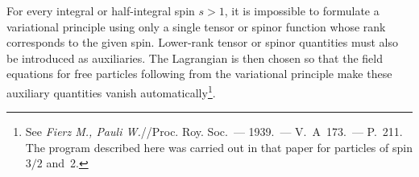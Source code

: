 For every integral or half-integral spin $s>1$, it is impossible to formulate a variational principle using only a single tensor or spinor function whose rank corresponds to the given spin. Lower-rank tensor or spinor quantities must also be introduced as auxiliaries. The Lagrangian is then chosen so that the field equations for free particles following from the variational principle make these auxiliary quantities vanish automatically\footnote{See \emph{Fierz M., Pauli W.}//Proc. Roy. Soc.~--- 1939.~--- V.~A~173.~--- P.~211. The program described here was carried out in that paper for particles of spin $3/2$ and~2.}.
